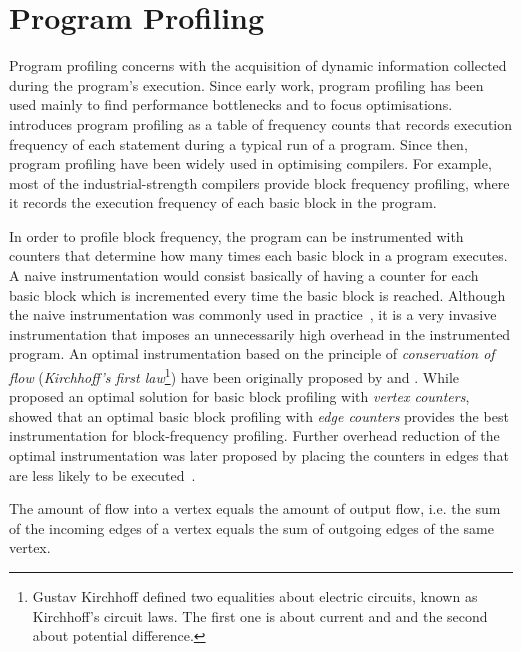 \section{Program Profiling} \label{subsec:optimalInstrumentation}

Program profiling concerns with the acquisition of dynamic information collected during the program's execution.
Since early work, program profiling has been used mainly to find performance bottlenecks and to focus optimisations.
\cite{knuth71} introduces program profiling as a table of frequency counts that records execution frequency of each statement during a typical run of a program.
Since then, program profiling have been widely used in optimising compilers.
For example, most of the industrial-strength compilers provide block frequency profiling, where it records the execution frequency of each basic block in the program.

In order to profile block frequency, the program can be instrumented with counters that determine how many times each basic block in a program executes.
A naive instrumentation would consist basically of having a counter for each basic block which is incremented every time the basic block is reached.
Although the naive instrumentation was commonly used in practice~\citep{knuth71}, it is a very invasive instrumentation that imposes an unnecessarily high overhead in the instrumented program.
An optimal instrumentation based on the principle of \textit{conservation of flow} (\textit{Kirchhoff's first law}\footnote{Gustav Kirchhoff defined two equalities about electric circuits, known as Kirchhoff's circuit laws. The first one is about current and and the second about potential difference.}) have been originally proposed by \cite{nahapetian73} and \cite{knuth73}.
While \cite{knuth73} proposed an optimal solution for basic block profiling with \textit{vertex counters}, \cite{ball94} showed that an optimal basic block profiling with \textit{edge counters} provides the best instrumentation for block-frequency profiling.
Further overhead reduction of the optimal instrumentation was later proposed by placing the counters in edges that are less likely to be executed~\cite{forman81,ball94}.

\begin{definition}
The amount of flow into a vertex equals the amount of output flow, i.e. the sum of the incoming edges of a vertex equals the sum of outgoing edges of the same vertex.
\end{definition}

